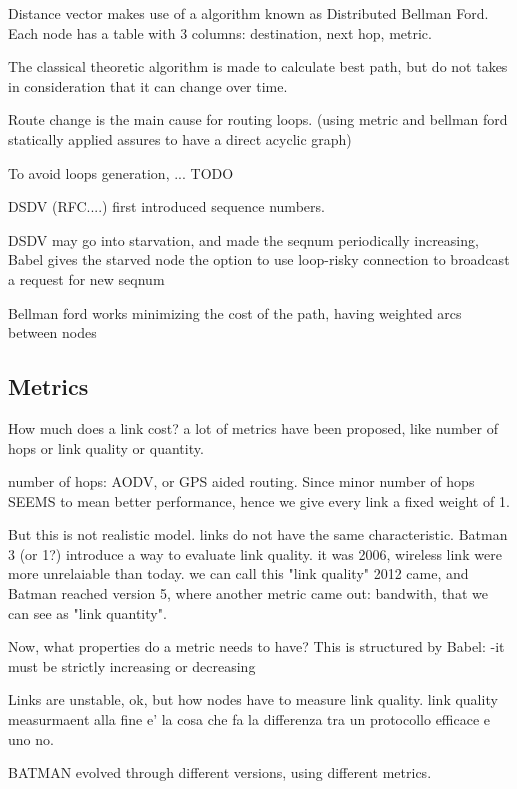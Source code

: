 \documentclass{article}
\begin{document}
Distance vector makes use of a algorithm known as Distributed Bellman Ford.
Each node has a table with 3 columns: destination, next hop, metric.


The classical theoretic algorithm is made to calculate best path, but do not takes in consideration that it can change over time.

Route change is the main cause for routing loops. (using metric and bellman ford statically applied assures to have a direct acyclic graph)

To avoid loops generation, ... TODO

DSDV (RFC....) first introduced sequence numbers.

DSDV may go into starvation, and made the seqnum periodically increasing, Babel gives the starved node the option to use loop-risky connection to broadcast a request for new seqnum



Bellman ford works minimizing the cost of the path, having weighted arcs between nodes

\subsection{Metrics}
How much does a link cost?
a lot of metrics have been proposed, like number of hops or link quality or quantity.

number of hops: AODV, or GPS aided routing. Since minor number of hops SEEMS to mean better performance, hence we give every link a fixed weight of 1.


But this is not realistic model. links do not have the same characteristic.
Batman 3 (or 1?) introduce a way to evaluate link quality. it was 2006, wireless link were more unrelaiable than today. we can call this "link quality"
2012 came, and Batman reached version 5, where another metric came out: bandwith, that we can see as "link quantity".

Now, what properties do a metric needs to have?
This is structured by Babel:
-it must be strictly increasing or decreasing


Links are unstable, ok, but how nodes have to measure link quality.
link quality measurmaent alla fine e' la cosa che fa la differenza tra un protocollo efficace e uno no.



BATMAN evolved through different versions, using different metrics.
\end{document}
